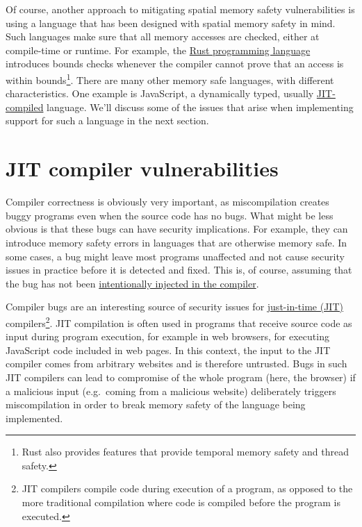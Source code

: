 \documentclass[
  a4paper,
]{report}
\begin{document}
Of course, another approach to mitigating spatial memory safety
vulnerabilities is using a language that has been designed with spatial
memory safety in mind. Such languages make sure that all memory accesses
are checked, either at compile-time or runtime. For example, the
\href{https://www.rust-lang.org/}{Rust programming language} introduces
bounds checks whenever the compiler cannot prove that an access is
within bounds\footnote{Rust also provides features that provide temporal
  memory safety and thread safety.}. There are many other memory safe
languages, with different characteristics. One example is JavaScript, a
dynamically typed, usually
\protect\hyperlink{jit-compiler-vulnerabilities}{JIT-compiled} language.
We'll discuss some of the issues that arise when implementing support
for such a language in the next section.

\hypertarget{jit-compiler-vulnerabilities}{%
\section{JIT compiler
vulnerabilities}\label{jit-compiler-vulnerabilities}}

Compiler correctness is obviously very important, as miscompilation
creates buggy programs even when the source code has no bugs. What might
be less obvious is that these bugs can have security implications. For
example, they can introduce memory safety errors in languages that are
otherwise memory safe. In some cases, a bug might leave most programs
unaffected and not cause security issues in practice before it is
detected and fixed. This is, of course, assuming that the bug has not
been \protect\hyperlink{supply-chain-attacks}{intentionally injected in
the compiler}.

Compiler bugs are an interesting source of security issues for
\href{https://en.wikipedia.org/wiki/Just-in-time_compilation}{just-in-time
(JIT)} compilers\footnote{JIT compilers compile
  code during execution of a program, as opposed to the more traditional
  compilation where code is compiled before the program is executed.}.
JIT compilation is often used in programs that receive source code as
input during program execution, for example in web browsers, for
executing JavaScript code included in web pages. In this context, the
input to the JIT compiler comes from arbitrary websites and is therefore
untrusted. Bugs in such JIT compilers can lead to compromise of the
whole program (here, the browser) if a malicious input (e.g.~coming from
a malicious website) deliberately triggers miscompilation in order to
break memory safety of the language being implemented.
\end{document}
